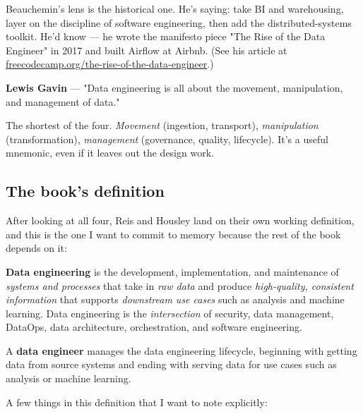 Beauchemin's lens is the historical one. He's saying: take BI and warehousing, layer on the discipline of software engineering, then add the distributed-systems toolkit. He'd know — he wrote the manifesto piece "The Rise of the Data Engineer" in 2017 and built Airflow at Airbnb. (See his article at \href{https://www.freecodecamp.org/news/the-rise-of-the-data-engineer-91be18f1e603/}{freecodecamp.org/the-rise-of-the-data-engineer}.)

\begin{quotebox}
\textbf{Lewis Gavin} — "Data engineering is all about the movement, manipulation, and management of data."
\end{quotebox}

The shortest of the four. \emph{Movement} (ingestion, transport), \emph{manipulation} (transformation), \emph{management} (governance, quality, lifecycle). It's a useful mnemonic, even if it leaves out the design work.

\subsection{The book's definition}

After looking at all four, Reis and Housley land on their own working definition, and this is the one I want to commit to memory because the rest of the book depends on it:

\begin{defbox}
\textbf{Data engineering} is the development, implementation, and maintenance of \emph{systems and processes} that take in \emph{raw data} and produce \emph{high-quality, consistent information} that supports \emph{downstream use cases} such as analysis and machine learning. Data engineering is the \emph{intersection} of security, data management, DataOps, data architecture, orchestration, and software engineering.

A \textbf{data engineer} manages the data engineering lifecycle, beginning with getting data from source systems and ending with serving data for use cases such as analysis or machine learning.
\end{defbox}

A few things in this definition that I want to note explicitly:

